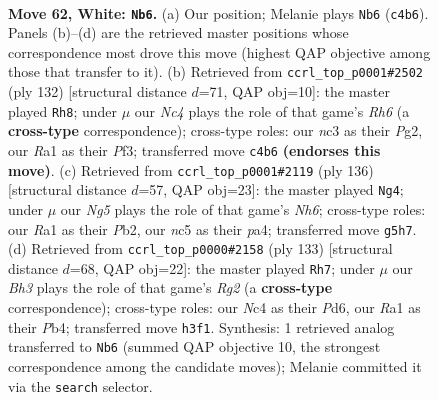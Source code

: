 \documentclass[11pt]{article}
\begin{document}
\clearpage

\begin{figure}[p]\centering
\begin{subfigure}{0.46\textwidth}\centering
\resizebox{\linewidth}{!}{%
\newchessgame
\chessboard[
  setfen={8/Pb6/5k2/2n3N1/1pN2P2/1Pn1K1PB/7P/R7 w - - 5 62},
  showmover=false,
  pgfstyle=straightmove, color=movearrow, markmove={c4-b6}
]}
\caption{}
\end{subfigure}\hfill
\begin{subfigure}{0.46\textwidth}\centering
\resizebox{\linewidth}{!}{%
\newchessgame
\chessboard[
  setfen={2b5/8/4n2R/1k4p1/1Pp5/2Pn1P2/6PK/B7 w - - 3 67},
  showmover=false,
  pgfstyle=straightmove, color=movearrow, markmove={h6-h8}
]}
\caption{}
\end{subfigure}
\\[4pt]
\begin{subfigure}{0.46\textwidth}\centering
\resizebox{\linewidth}{!}{%
\newchessgame
\chessboard[
  setfen={5n2/1p4k1/3p3N/r4BP1/p1b1PN1P/P7/1P6/6K1 w - - 3 69},
  showmover=false,
  pgfstyle=straightmove, color=movearrow, markmove={h6-g4}
]}
\caption{}
\end{subfigure}\hfill
\begin{subfigure}{0.46\textwidth}\centering
\resizebox{\linewidth}{!}{%
\newchessgame
\chessboard[
  setfen={8/6r1/3p4/1N1Pkb2/1p2p3/5n2/1P3K2/2Q5 b - - 4 67},
  showmover=false,
  pgfstyle=straightmove, color=movearrow, markmove={g7-h7}
]}
\caption{}
\end{subfigure}
\caption{\textbf{Move 62, White: \texttt{Nb6}.} (a) Our position; Melanie plays \texttt{Nb6} (\texttt{c4b6}). Panels (b)--(d) are the retrieved master positions whose correspondence most drove this move (highest QAP objective among those that transfer to it). (b) Retrieved from \texttt{ccrl\_top\_p0001\#2502} (ply 132) [structural distance $d$=71, QAP obj=10]: the master played \texttt{Rh8}; under $\mu$ our \emph{Nc4} plays the role of that game's \emph{Rh6} (a \textbf{cross-type} correspondence); cross-type roles: our \emph{n}c3 as their \emph{P}g2, our \emph{R}a1 as their \emph{P}f3; transferred move \texttt{c4b6} \textbf{(endorses this move)}. (c) Retrieved from \texttt{ccrl\_top\_p0001\#2119} (ply 136) [structural distance $d$=57, QAP obj=23]: the master played \texttt{Ng4}; under $\mu$ our \emph{Ng5} plays the role of that game's \emph{Nh6}; cross-type roles: our \emph{R}a1 as their \emph{P}b2, our \emph{n}c5 as their \emph{p}a4; transferred move \texttt{g5h7}. (d) Retrieved from \texttt{ccrl\_top\_p0000\#2158} (ply 133) [structural distance $d$=68, QAP obj=22]: the master played \texttt{Rh7}; under $\mu$ our \emph{Bh3} plays the role of that game's \emph{Rg2} (a \textbf{cross-type} correspondence); cross-type roles: our \emph{N}c4 as their \emph{P}d6, our \emph{R}a1 as their \emph{P}b4; transferred move \texttt{h3f1}. Synthesis: 1 retrieved analog transferred to \texttt{Nb6} (summed QAP objective 10, the strongest correspondence among the candidate moves); Melanie committed it via the \texttt{search} selector.}
\label{fig:thought-m122}
\end{figure}
\end{document}
